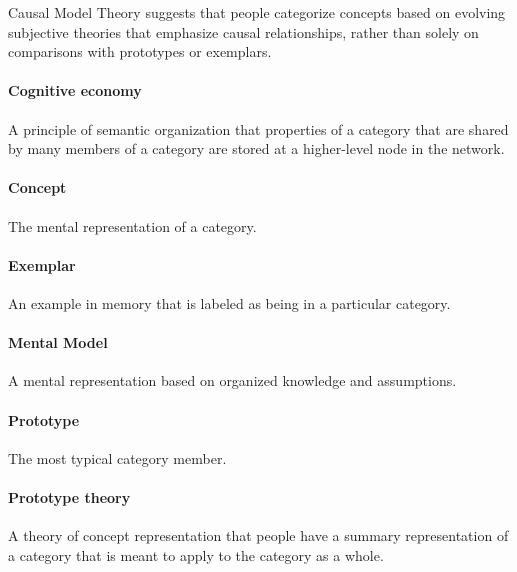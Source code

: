 \documentclass[
]{krantz}
\begin{document}
Causal Model Theory suggests that people categorize concepts based on evolving subjective theories that emphasize causal relationships, rather than solely on comparisons with prototypes or exemplars.

\paragraph*{Cognitive economy}\label{cognitive-economy}

A principle of semantic organization that properties of a category that are shared by many members of a category are stored at a higher-level node in the network.

\paragraph*{Concept}\label{concept}

The mental representation of a category.

\paragraph*{Exemplar}\label{exemplar}

An example in memory that is labeled as being in a particular category.

\paragraph*{Mental Model}\label{mental-model}

A mental representation based on organized knowledge and assumptions.

\paragraph*{Prototype}\label{prototype-def}

The most typical category member.

\paragraph*{Prototype theory}\label{prototype-theory}

A theory of concept representation that people have a summary representation of a category that is meant to apply to the category as a whole.
\end{document}
